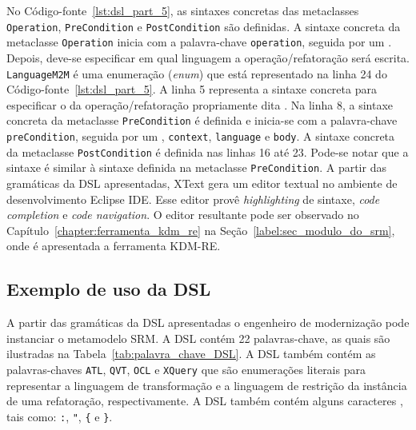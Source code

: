 No Código-fonte~\ref{lst:dsl_part_5}, as sintaxes concretas das metaclasses \texttt{Operation}, \texttt{PreCondition} e \texttt{PostCondition} são definidas. A sintaxe concreta da metaclasse \texttt{Operation} inicia com a palavra-chave \texttt{operation}, seguida por um \aspas{\{}. Depois, deve-se especificar em qual linguagem a operação/refatoração será escrita. \texttt{LanguageM2M} é uma enumeração (\textit{enum}) que está representado na linha 24 do Código-fonte~\ref{lst:dsl_part_5}. A linha 5 representa a sintaxe concreta para especificar o  da operação/refatoração propriamente dita . Na linha 8, a sintaxe concreta da metaclasse \texttt{PreCondition} é definida e inicia-se com a palavra-chave \texttt{preCondition}, seguida por um \aspas{\{}, \texttt{context}, \texttt{language} e \texttt{body}. A sintaxe concreta da metaclasse \texttt{PostCondition} é definida nas linhas 16 até 23. Pode-se notar que a sintaxe é similar à sintaxe definida na metaclasse \texttt{PreCondition}. A partir das gramáticas da DSL apresentadas, XText gera um editor textual no ambiente de desenvolvimento Eclipse IDE. Esse editor provê \textit{highlighting} de sintaxe, \textit{code completion} e \textit{code navigation}. O editor resultante pode ser observado no Capítulo~\ref{chapter:ferramenta_kdm_re} na Seção~\ref{label:sec_modulo_do_srm}, onde é apresentada a ferramenta KDM-RE.

\subsection{Exemplo de uso da DSL}

A partir das gramáticas da DSL apresentadas o engenheiro de modernização pode instanciar o metamodelo SRM. A DSL contém 22 palavras-chave, as quais são ilustradas na Tabela~\ref{tab:palavra_chave_DSL}. A DSL também contém as palavras-chaves \texttt{ATL}, \texttt{QVT}, \texttt{OCL} e \texttt{XQuery} que são enumerações literais para representar a linguagem de transformação e a linguagem de restrição da instância de uma refatoração, respectivamente. A DSL também contém alguns caracteres , tais como: \texttt{:}, \texttt{"}, \texttt{\{} e \texttt{\}}.



